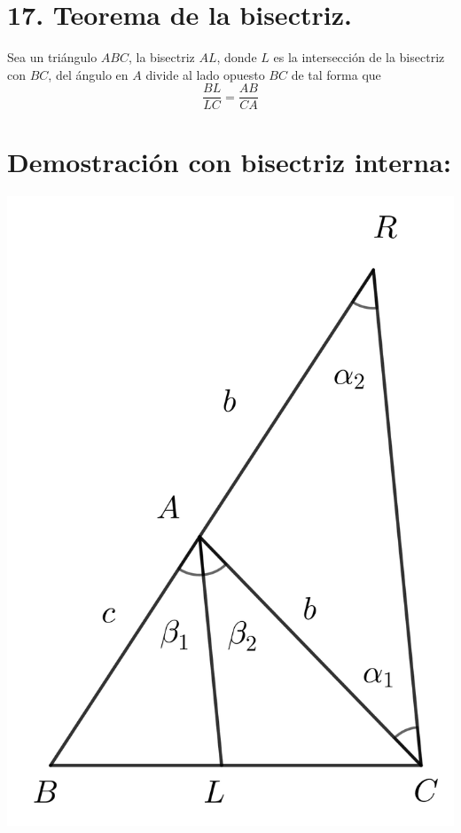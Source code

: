 \documentclass[12pt,a4paper, oneside]{book}
\begin{document}
\section{17. Teorema de la bisectriz.}
Sea un triángulo $ABC$, la bisectriz $AL$, donde $L$ es la intersección de la bisectriz con $BC$, del ángulo en $A$ divide al lado opuesto $BC$ de tal forma que
$$\dfrac{BL}{LC}=\dfrac{AB}{CA}$$
\section{Demostración con bisectriz interna:}
\begin{center}
\includegraphics[scale=0.6]{Imagenes/bisectriz_int.png} 
\end{center}
\end{document}
